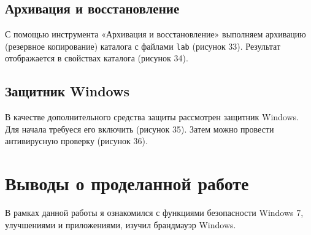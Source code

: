 \subsection{Архивация и восстановление}
С помощью инструмента «Архивация и восстановление» выполняем архивацию
(резервное копирование) каталога с файлами \texttt{lab} (рисунок 33). Результат отображается в свойствах каталога (рисунок 34).
\FloatBarrier


\subsection{Защитник Windows}
В качестве дополнительного средства защиты рассмотрен защитник Windows. Для начала требуеся его включить (рисунок 35). Затем можно провести антивирусную проверку (рисунок 36).
\FloatBarrier


\clearpage



\section{Выводы о проделанной работе}
В рамках данной работы я ознакомился с функциями безопасности Windows 7, улучшениями и приложениями, изучил брандмауэр Windows.